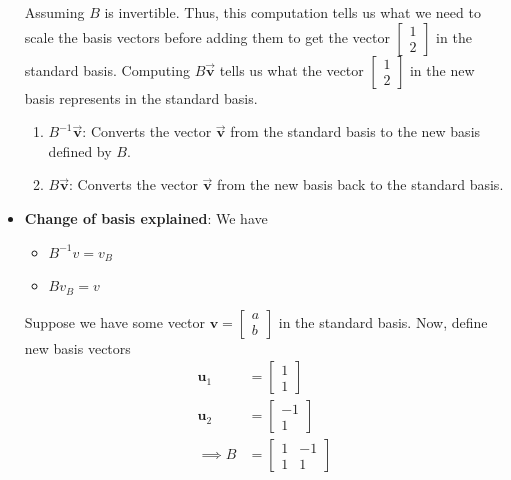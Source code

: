 \documentclass{report}
\begin{document}
\begin{itemize}
            \bigbreak \noindent 
            Assuming $B$ is invertible. Thus, this computation tells us what we need to scale the basis vectors before adding them to get the vector $\begin{bmatrix} 1 \\ 2\end{bmatrix}$ in the standard basis.
            \bigbreak \noindent 
            Computing $B\vec{\mathbf{v}}$ tells us what the vector $\begin{bmatrix} 1\\2 \end{bmatrix} $ in the new basis represents in the standard basis.
            \bigbreak \noindent 
            \begin{enumerate}
                \item $B^{-1}\vec{\mathbf{v}}$: Converts the vector $\vec{\mathbf{v}}$ from the standard basis to the new basis defined by $B$.
                \item $B\vec{\mathbf{v}}$: Converts the vector $\vec{\mathbf{v}}$ from the new basis back to the standard basis.
            \end{enumerate}
        \item \textbf{Change of basis explained}: We have
            \begin{itemize}
                \item $B^{-1}v = v_{B}$
                \item $Bv_{B} = v$
            \end{itemize}
            \bigbreak \noindent 
            Suppose we have some vector $\mathbf{v} = \begin{bmatrix} a \\ b \end{bmatrix} $ in the standard basis. Now, define new basis vectors
            \begin{align*}
                \mathbf{u}_{1} &= \begin{bmatrix} 1 \\ 1\end{bmatrix} \\
                \mathbf{u}_{2} &= \begin{bmatrix} -1 \\ 1\end{bmatrix} \\ 
                \implies B &= \begin{bmatrix} 1 & -1 \\ 1 & 1\end{bmatrix}

\end{align*}
\end{itemize}
\end{document}
